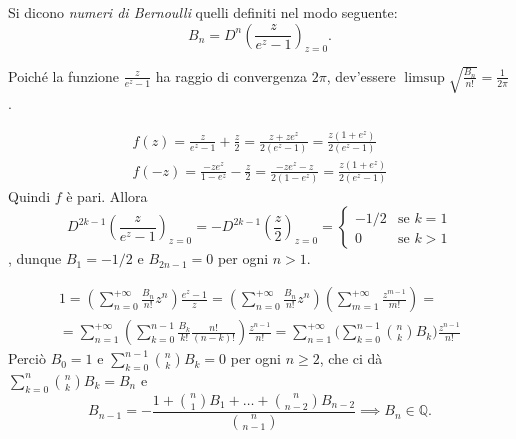 \begin{defn}
  Si dicono \textit{numeri di Bernoulli} quelli definiti nel modo seguente:
  $$B_n=D^n\left(\frac{z}{e^z-1}\right)_{z=0}.$$
\end{defn}

\begin{oss}
  Poiché la funzione $\frac{z}{e^z-1}$ ha raggio di convergenza $2\pi$, dev'essere $\displaystyle \limsup \sqrt{\frac{B_n}{n!}}=\frac{1}{2\pi}$.
\end{oss}

\begin{oss}
  \begin{gather*}
    f(z)=\frac{z}{e^z-1}+\frac{z}{2}=\frac{z+ze^z}{2(e^z-1)}=\frac{z(1+e^z)}{2(e^z-1)} \\
    f(-z)=\frac{-ze^z}{1-e^z}-\frac{z}{2}=\frac{-ze^z-z}{2(1-e^z)}=\frac{z(1+e^z)}{2(e^z-1)}
  \end{gather*}
  Quindi $f$ è pari. Allora
  $$D^{2k-1}\left(\frac{z}{e^z-1}\right)_{z=0}=-D^{2k-1}\left(\frac{z}{2}\right)_{z=0}=\begin{cases}
    -1/2 & \mbox{se }k=1 \\ 0 & \mbox{se } k>1
\end{cases}$$,
dunque $B_1=-1/2$ e $B_{2n-1}=0$ per ogni $n>1$.
\end{oss}

\begin{oss}
  \begin{gather*}
    1=\left(\sum_{n=0}^{+\infty}\frac{B_n}{n!}z^n\right)\frac{e^z-1}{z}=\left(\sum_{n=0}^{+\infty}\frac{B_n}{n!}z^n\right)\left(\sum_{m=1}^{+\infty}\frac{z^{m-1}}{m!}\right)= \\
    =\sum_{n=1}^{+\infty}\left(\sum_{k=0}^{n-1}\frac{B_k}{k!}\frac{n!}{(n-k)!}\right)\frac{z^{n-1}}{n!}=\sum_{n=1}^{+\infty}\Bigg(\sum_{k=0}^{n-1}\binom{n}{k}B_k\Bigg)\frac{z^{n-1}}{n!}
  \end{gather*}
  Perciò $B_0=1$ e $\displaystyle \sum_{k=0}^{n-1}\binom{n}{k}B_k=0$ per ogni $n \ge 2$, che ci dà $\displaystyle \sum_{k=0}^n\binom{n}{k}B_k=B_n$ e
  $$B_{n-1}=-\frac{1+\binom{n}{1}B_1+\dots+\binom{n}{n-2}B_{n-2}}{\binom{n}{n-1}} \implies B_n \in \mathbb{Q}.$$
\end{oss}


